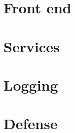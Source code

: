 \documentclass[letterpaper,twocolumn,10pt]{article}
\begin{document}
\section{Front end}


\section{Services}


\section{Logging}


\section{Defense}





\end{document}
